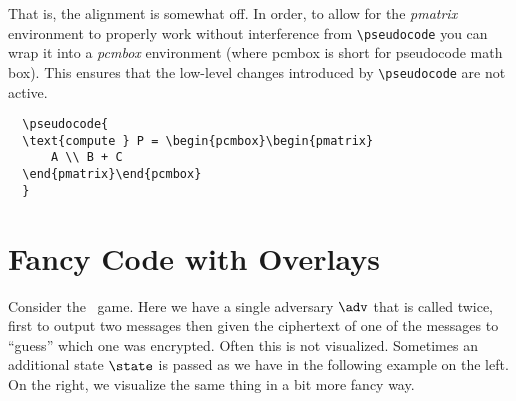 \documentclass[a4paper]{report}
\begin{document}
  That is, the alignment is somewhat off. In order, to allow for the \emph{pmatrix} environment to properly work without interference from \lstinline{\pseudocode}
  you can wrap it into a \emph{pcmbox} environment (where pcmbox is short for pseudocode math box). This ensures that the low-level changes introduced by  \lstinline{\pseudocode} are not active.
  
  \begin{lstlisting}
  \pseudocode{
  \text{compute } P = \begin{pcmbox}\begin{pmatrix}
	  A \\ B + C
  \end{pmatrix}\end{pcmbox}
  }
  \end{lstlisting}
  
  \begin{center}
  \end{center}
  
  
  \section{Fancy Code with Overlays}
  
  Consider the \indcpa\ game. Here we have a single adversary $\adv$ that is called twice, first to output two messages then
  given the ciphertext of one of the messages to \enquote{guess} which one was encrypted. Often this is not visualized.
  Sometimes an additional state $\state$ is passed as we have in the following example on the left. On the right,
  we visualize the same thing in a bit more fancy way.
  
\end{document}
